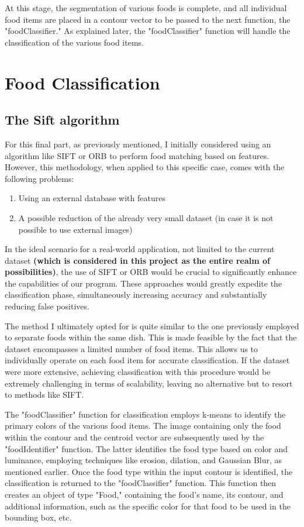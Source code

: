 \documentclass[
	a4paper, %
	10pt, %
	unnumberedsections, %
	twoside, %
]{LTJournalArticle}
\begin{document}
At this stage, the segmentation of various foods is complete, and all individual food items are placed in a contour vector to be passed to the next function, the "foodClassifier." As explained later, the "foodClassifier" function will handle the classification of the various food items.

\section{Food Classification}
\subsection{The Sift algorithm}
For this final part, as previously mentioned, I initially considered using an algorithm like SIFT or ORB to perform food matching based on features. However, this methodology, when applied to this specific case, comes with the following problems:

\begin{enumerate}
	\item Using an external database with features
	\item A possible reduction of the already very small dataset (in case it is not possible to use external images)
\end{enumerate}

In the ideal scenario for a real-world application, not limited to the current dataset \textbf{(which is considered in this project as the entire realm of possibilities)}, the use of SIFT or ORB would be crucial to significantly enhance the capabilities of our program. These approaches would greatly expedite the classification phase, simultaneously increasing accuracy and substantially reducing false positives.

The method I ultimately opted for is quite similar to the one previously employed to separate foods within the same dish. This is made feasible by the fact that the dataset encompasses a limited number of food items. This allows us to individually operate on each food item for accurate classification. If the dataset were more extensive, achieving classification with this procedure would be extremely challenging in terms of scalability, leaving no alternative but to resort to methods like SIFT.

The "foodClassifier" function for classification employs k-means to identify the primary colors of the various food items. The image containing only the food within the contour and the centroid vector are subsequently used by the "foodIdentifier" function. The latter identifies the food type based on color and luminance, employing techniques like erosion, dilation, and Gaussian Blur, as mentioned earlier. Once the food type within the input contour is identified, the classification is returned to the "foodClassifier" function. This function then creates an object of type "Food," containing the food's name, its contour, and additional information, such as the specific color for that food to be used in the bounding box, etc.
\end{document}
